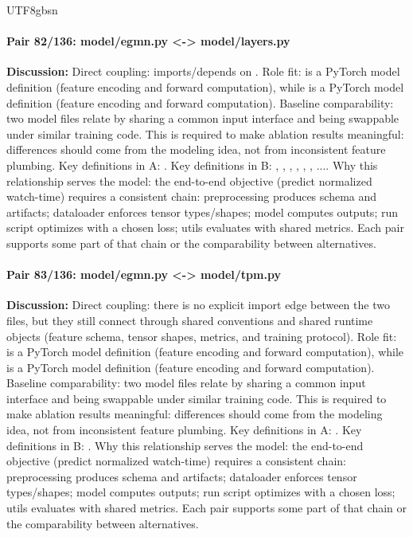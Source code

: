 \documentclass[11pt]{article}
\begin{document}
\begin{CJK*}{UTF8}{gbsn}
\paragraph{Pair 82/136: model/egmn.py <-> model/layers.py}
\textbf{Discussion:} Direct coupling: \texttt{} imports/depends on \texttt{}. Role fit: \texttt{} is a PyTorch model definition (feature encoding and forward computation), while \texttt{} is a PyTorch model definition (feature encoding and forward computation). Baseline comparability: two model files relate by sharing a common input interface and being swappable under similar training code. This is required to make ablation results meaningful: differences should come from the modeling idea, not from inconsistent feature plumbing. Key definitions in A: \texttt{}. Key definitions in B: \texttt{}, \texttt{}, \texttt{}, \texttt{}, \texttt{}, \texttt{}, .... Why this relationship serves the model: the end-to-end objective (predict normalized watch-time) requires a consistent chain: preprocessing produces schema and artifacts; dataloader enforces tensor types/shapes; model computes outputs; run script optimizes with a chosen loss; utils evaluates with shared metrics. Each pair supports some part of that chain or the comparability between alternatives.

\paragraph{Pair 83/136: model/egmn.py <-> model/tpm.py}
\textbf{Discussion:} Direct coupling: there is no explicit import edge between the two files, but they still connect through shared conventions and shared runtime objects (feature schema, tensor shapes, metrics, and training protocol). Role fit: \texttt{} is a PyTorch model definition (feature encoding and forward computation), while \texttt{} is a PyTorch model definition (feature encoding and forward computation). Baseline comparability: two model files relate by sharing a common input interface and being swappable under similar training code. This is required to make ablation results meaningful: differences should come from the modeling idea, not from inconsistent feature plumbing. Key definitions in A: \texttt{}. Key definitions in B: \texttt{}. Why this relationship serves the model: the end-to-end objective (predict normalized watch-time) requires a consistent chain: preprocessing produces schema and artifacts; dataloader enforces tensor types/shapes; model computes outputs; run script optimizes with a chosen loss; utils evaluates with shared metrics. Each pair supports some part of that chain or the comparability between alternatives.


\end{CJK*}
\end{document}
